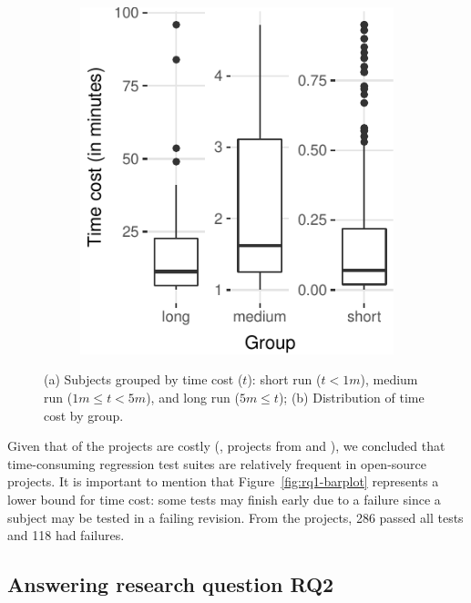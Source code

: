 \begin{figure}[ht]
\begin{subfigure}{0.25\textwidth}
        \includegraphics[width=\textwidth]{plots/boxplot-timecost.pdf}
        \caption{\label{fig:rq1-boxplot}}
    \end{subfigure}%
    \caption{(a) Subjects grouped by time cost ($t$): short run ($t <
    1m$), medium run ($1m \le t < 5m$), and long run ($5m \le t$); (b)
    Distribution of time cost by group.}
\end{figure}

Given that \percentMedLongRunning{} of the projects are costly (\ie,
\numMedLong{} projects from \medg{} and \longg{}), we concluded that
time-consuming regression test suites are relatively frequent in
open-source projects.  It is important to mention that
Figure~\ref{fig:rq1-barplot} represents a lower bound for time cost:
some tests may finish early due to a failure since a subject may be
tested in a failing revision. From the \numSubjs{} projects, 286
passed all tests and 118 had failures. 

\subsection{Answering research question RQ2}
\label{sec:rqB}

